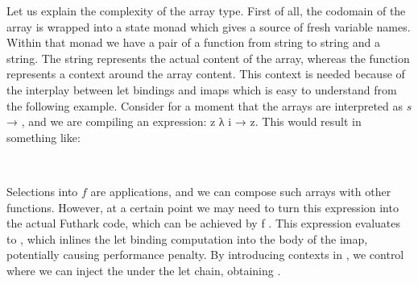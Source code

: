 Let us explain the complexity of the array type.  First of all, the codomain
of the array is wrapped into a state monad which gives a source of fresh variable
names.  Within that monad we have a pair of a function from string to string and
a string.  The string represents the actual content of the array, whereas the
function represents a context around the array content.
This context is needed because of the interplay between let bindings and
imaps which is easy to understand from the following example.
Consider for a moment that the arrays are interpreted as  $s$ →   ,
and we are compiling an expression:
 z \AF{:=}    λ i → z.  This would
result in something like:
\begin{code}%
%
\>[2]\AgdaSpace{}%
\AgdaSymbol{:}\AgdaSpace{}%
\AgdaSpace{}%
\AgdaSpace{}%
\AgdaSpace{}%
\AgdaSpace{}%
\AgdaSpace{}%
\<%
\\
%
\>[2]\AgdaSpace{}%
\AgdaSpace{}%
\AgdaSymbol{=}\AgdaSpace{}%
\AgdaSpace{}%
\AgdaSymbol{(}\AgdaSpace{}%
\AgdaOperator{\AgdaFunction{++}}\AgdaSpace{}%
\AgdaSpace{}%
\AgdaSpace{}%
\AgdaSpace{}%
\AgdaSymbol{)}\AgdaSpace{}%
\AgdaSymbol{)}\<%
\end{code}
Selections into $f$ are applications, and we can compose such arrays
with other functions.  However,
at a certain point we may need to turn this expression into the actual
Futhark code, which can be achieved by  \AF{++} f .
This expression evaluates to ,
which inlines the let binding computation into the body of the imap,
potentially causing performance penalty.
By introducing contexts in , we control where
we can inject the  under the let chain, obtaining
.

